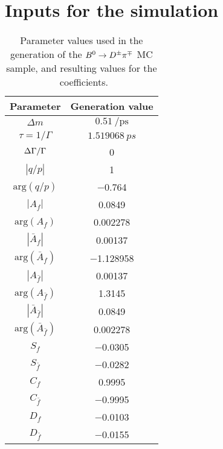 \section[Inputs for the $\Bz\to\Dpm\pimp$ simulation]{Inputs for the \boldmath{$\Bz\to\Dpm\pimp$} simulation}
\label{app:mcgen}

\begin{table}[htbp]
  \begin{center}
    \caption{Parameter values used in the generation of the $\Bz\to\Dpm\pimp$
    MC sample, and resulting values for the \CP~coefficients.}
    \begin{tabular}{cc}
    Parameter & Generation value \\
\toprule
$\Delta m$ & $\SI{0.51}{\per\pico\second}$ \\
$\tau=1/\Gamma$ & $\SI{1.519068}{ps}$ \\
$\Delta\Gamma/\Gamma$ & \num{0} \\
$\left|q/p\right|$ & \num{1} \\
$\text{arg}\!\left(q/p\right)$ & \num{-0.764} \\
$\left|A_{f}\right|$ & \num{0.0849} \\
$\text{arg}\!\left(A_{f}\right)$ & \num{0.002278} \\
$\left|\bar A_{f}\right|$ & \num{0.00137} \\
$\text{arg}\!\left(\bar A_{f}\right)$ & \num{-1.128958} \\
$\left|A_{\bar f}\right|$ & \num{0.00137} \\
$\text{arg}\!\left(A_{\bar f}\right)$ & \num{1.3145} \\
$\left|\bar A_{\bar f}\right|$ & \num{0.0849} \\
$\text{arg}\!\left(\bar A_{\bar f}\right)$ & \num{0.002278} \\
\midrule
$S_{f}$ & \num{-0.0305} \\
$S_{\bar f}$ & \num{-0.0282} \\
$C_{f}$ & \num{0.9995} \\
$C_{\bar f}$ & \num{-0.9995} \\
$D_{f}$ & \num{-0.0103} \\
$D_{\bar f}$ & \num{-0.0155} \\
\bottomrule
    \end{tabular}
    \label{tab:MCgen}
  \end{center}
\end{table}
